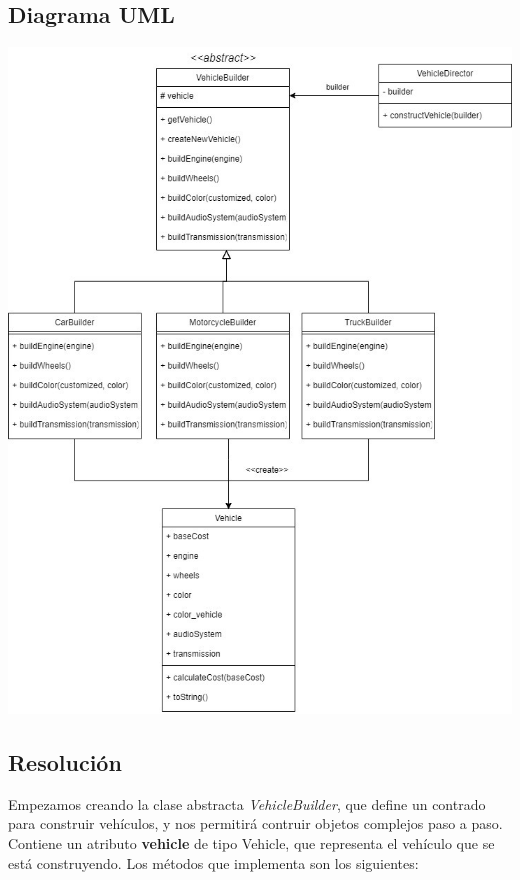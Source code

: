 \documentclass{article} %
\begin{document}
    \subsection{Diagrama UML}
    \includegraphics[width=\textwidth, height=\textheight]{imagenes/EJ3.jpeg}

    \subsection{Resolución}
    \hspace*{1cm}Empezamos creando la clase abstracta \textit{VehicleBuilder}, que define un contrado para construir vehículos,
    y nos permitirá contruir objetos complejos paso a paso.
    Contiene un atributo \textbf{vehicle} de tipo Vehicle, que representa el vehículo que se está construyendo.
    Los métodos que implementa son los siguientes:
\end{document}
